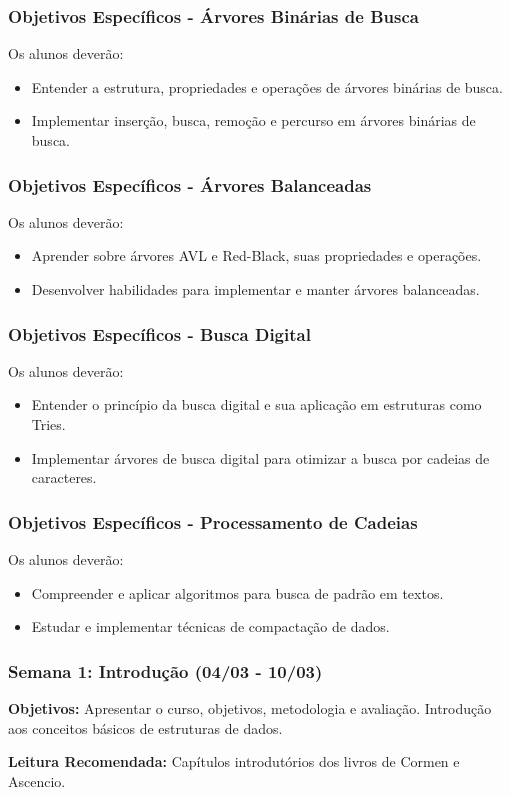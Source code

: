 \begin{frame}
  \frametitle{Objetivos Específicos - Árvores Binárias de Busca}
  Os alunos deverão:
  \begin{itemize}
    \item Entender a estrutura, propriedades e operações de árvores binárias de busca.
    \item Implementar inserção, busca, remoção e percurso em árvores binárias de busca.
  \end{itemize}
\end{frame}
\begin{frame}
  \frametitle{Objetivos Específicos - Árvores Balanceadas}
  Os alunos deverão:
  \begin{itemize}
    \item Aprender sobre árvores AVL e Red-Black, suas propriedades e operações.
    \item Desenvolver habilidades para implementar e manter árvores balanceadas.
  \end{itemize}
\end{frame}

\begin{frame}
  \frametitle{Objetivos Específicos - Busca Digital}
  Os alunos deverão:
  \begin{itemize}
    \item Entender o princípio da busca digital e sua aplicação em estruturas como Tries.
    \item Implementar árvores de busca digital para otimizar a busca por cadeias de caracteres.
  \end{itemize}
\end{frame}

\begin{frame}
  \frametitle{Objetivos Específicos - Processamento de Cadeias}
  Os alunos deverão:
  \begin{itemize}
    \item Compreender e aplicar algoritmos para busca de padrão em textos.
    \item Estudar e implementar técnicas de compactação de dados.
  \end{itemize}
\end{frame}

\begin{frame}
  \frametitle{Semana 1: Introdução (04/03 - 10/03)}
  \textbf{Objetivos:} Apresentar o curso, objetivos, metodologia e avaliação. Introdução aos conceitos básicos de estruturas de dados.
  
  \textbf{Leitura Recomendada:} Capítulos introdutórios dos livros de Cormen e Ascencio.
\end{frame}

